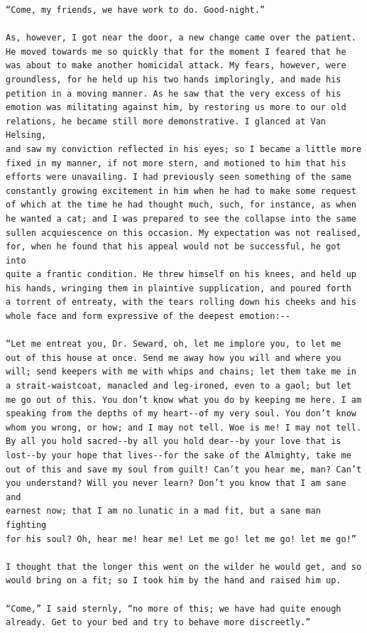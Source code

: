 \documentclass{article}
\begin{document}
\begin{verbatim}
“Come, my friends, we have work to do. Good-night.”

As, however, I got near the door, a new change came over the patient.
He moved towards me so quickly that for the moment I feared that he
was about to make another homicidal attack. My fears, however, were
groundless, for he held up his two hands imploringly, and made his
petition in a moving manner. As he saw that the very excess of his
emotion was militating against him, by restoring us more to our old
relations, he became still more demonstrative. I glanced at Van Helsing,
and saw my conviction reflected in his eyes; so I became a little more
fixed in my manner, if not more stern, and motioned to him that his
efforts were unavailing. I had previously seen something of the same
constantly growing excitement in him when he had to make some request
of which at the time he had thought much, such, for instance, as when
he wanted a cat; and I was prepared to see the collapse into the same
sullen acquiescence on this occasion. My expectation was not realised,
for, when he found that his appeal would not be successful, he got into
quite a frantic condition. He threw himself on his knees, and held up
his hands, wringing them in plaintive supplication, and poured forth
a torrent of entreaty, with the tears rolling down his cheeks and his
whole face and form expressive of the deepest emotion:--

“Let me entreat you, Dr. Seward, oh, let me implore you, to let me
out of this house at once. Send me away how you will and where you
will; send keepers with me with whips and chains; let them take me in
a strait-waistcoat, manacled and leg-ironed, even to a gaol; but let
me go out of this. You don’t know what you do by keeping me here. I am
speaking from the depths of my heart--of my very soul. You don’t know
whom you wrong, or how; and I may not tell. Woe is me! I may not tell.
By all you hold sacred--by all you hold dear--by your love that is
lost--by your hope that lives--for the sake of the Almighty, take me
out of this and save my soul from guilt! Can’t you hear me, man? Can’t
you understand? Will you never learn? Don’t you know that I am sane and
earnest now; that I am no lunatic in a mad fit, but a sane man fighting
for his soul? Oh, hear me! hear me! Let me go! let me go! let me go!”

I thought that the longer this went on the wilder he would get, and so
would bring on a fit; so I took him by the hand and raised him up.

“Come,” I said sternly, “no more of this; we have had quite enough
already. Get to your bed and try to behave more discreetly.”


\end{verbatim}
\end{document}
